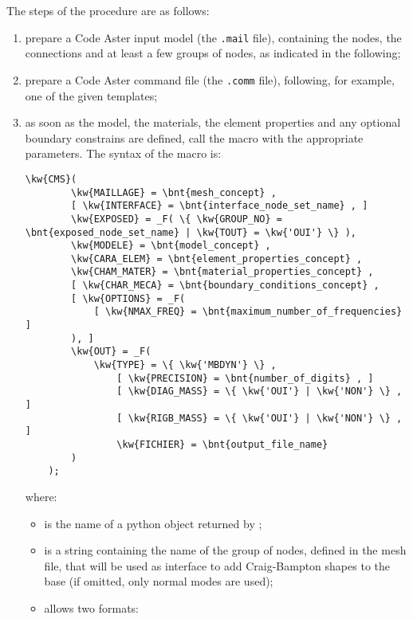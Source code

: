 The steps of the procedure are as follows:
\begin{enumerate} %

\item prepare a Code Aster input model (the \texttt{.mail} file),
containing the nodes, the connections and at least a few groups
of nodes, as indicated in the following;

\item prepare a Code Aster command file (the \texttt{.comm} file),
following, for example, one of the given templates;

\item as soon as the model, the materials, the element properties
and any optional boundary constrains are defined,
call the  macro with the appropriate parameters.
The syntax of the macro is:
\begin{Verbatim}[commandchars=\\\{\}]
    \kw{CMS}(
        \kw{MAILLAGE} = \bnt{mesh_concept} ,
        [ \kw{INTERFACE} = \bnt{interface_node_set_name} , ]
        \kw{EXPOSED} = _F( \{ \kw{GROUP_NO} = \bnt{exposed_node_set_name} | \kw{TOUT} = \kw{'OUI'} \} ),
        \kw{MODELE} = \bnt{model_concept} ,
        \kw{CARA_ELEM} = \bnt{element_properties_concept} ,
        \kw{CHAM_MATER} = \bnt{material_properties_concept} ,
        [ \kw{CHAR_MECA} = \bnt{boundary_conditions_concept} ,
        [ \kw{OPTIONS} = _F(
            [ \kw{NMAX_FREQ} = \bnt{maximum_number_of_frequencies} ]
        ), ]
        \kw{OUT} = _F(
            \kw{TYPE} = \{ \kw{'MBDYN'} \} ,
                [ \kw{PRECISION} = \bnt{number_of_digits} , ]
                [ \kw{DIAG_MASS} = \{ \kw{'OUI'} | \kw{'NON'} \} , ]
                [ \kw{RIGB_MASS} = \{ \kw{'OUI'} | \kw{'NON'} \} , ]
                \kw{FICHIER} = \bnt{output_file_name}
        )
    );
\end{Verbatim}
where:
\begin{itemize}
\item {} is the name of a python object
	returned by ;
\item {} is a string containing the name of the group of nodes,
	defined in the mesh file, that will be used as interface
	to add Craig-Bampton shapes to the base
	(if omitted, only normal modes are used);
\item {} allows two formats:
	\begin{itemize}

\end{itemize}
\end{itemize}
\end{enumerate}
